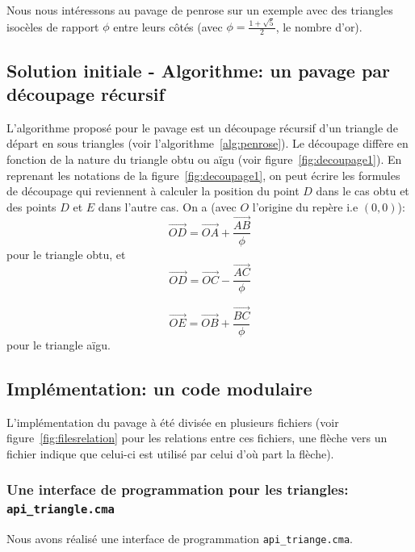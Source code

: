 \documentclass[a4paper,13pt]{article}
\begin{document}
Nous nous intéressons au pavage de penrose sur un exemple avec des triangles isocèles de rapport $\phi$ entre leurs côtés (avec $\phi = \frac{1 + \sqrt{5}}{2}$, le nombre d'or).

\subsection{Solution initiale - Algorithme: un pavage par découpage récursif}
L'algorithme proposé pour le pavage est un découpage récursif d'un triangle de départ en sous triangles (voir l'algorithme~\ref{alg:penrose}). Le découpage diffère en fonction de la nature du triangle obtu ou aïgu (voir figure~\ref{fig:decoupage1}).
En reprenant les notations de la figure~\ref{fig:decoupage1}, on peut écrire les formules de découpage qui reviennent à calculer la position du point $D$ dans le cas obtu et des points $D$ et $E$ dans l'autre cas. On a (avec $O$ l'origine du repère i.e $(0,0)$):
\[ \vec{OD} = \vec{OA} + \frac{\vec{AB}}{\phi}\]
pour le triangle obtu, et
\[ \vec{OD} = \vec{OC} - \frac{\vec{AC}}{\phi}\]

\[ \vec{OE} = \vec{OB} + \frac{\vec{BC}}{\phi}\]
pour le triangle aïgu.
\subsection{Implémentation: un code modulaire}

L'implémentation du pavage à été divisée en plusieurs fichiers (voir figure~\ref{fig:filesrelation} pour les relations entre ces fichiers, une flèche vers un fichier indique que celui-ci est utilisé par celui d'où part la flèche).



\subsubsection{Une interface de programmation pour les triangles: \texttt{api\_triangle.cma}}
Nous avons réalisé une interface de programmation \texttt{api_triange.cma}.
\end{document}
